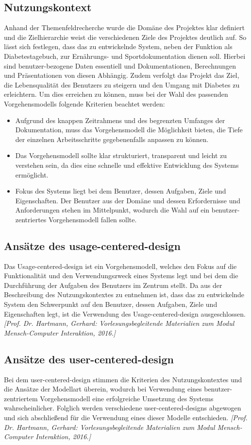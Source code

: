 \documentclass[a4paper,11pt]{article}%
\renewcommand{\\}{\vspace*{0.5\baselineskip} \newline}
\begin{document}
	\subsection{Nutzungskontext}
		Anhand der Themenfeldrecherche wurde die Domäne des Projektes klar definiert und die Zielhierarchie weist die verschiedenen Ziele des Projektes deutlich auf. So lässt sich festlegen, dass das zu entwickelnde System, neben der Funktion als Diabetestagebuch, zur Ernährungs- und Sportdokumentation dienen soll. Hierbei sind benutzer-bezogene Daten essentiell und Dokumentationen, Berechnungen und Präsentationen von diesen Abhängig. Zudem verfolgt das Projekt das Ziel, die Lebensqualität des Benutzers zu steigern und den Umgang mit Diabetes zu erleichtern. \newline
		Um dies erreichen zu können, muss bei der Wahl des passenden Vorgehensmodells folgende Kriterien beachtet werden:
		\begin{itemize}
			\item Aufgrund des knappen Zeitrahmens und des begrenzten Umfanges der Dokumentation, muss das Vorgehensmodell die Möglichkeit bieten, die Tiefe der einzelnen Arbeitsschritte gegebenenfalls anpassen zu können.
			\item Das Vorgehensmodell sollte klar strukturiert, transparent und leicht zu verstehen sein, da dies eine schnelle und effektive Entwicklung des Systems ermöglicht.
			\item Fokus des Systems liegt bei dem Benutzer, dessen Aufgaben, Ziele und Eigenschaften. Der Benutzer aus der Domäne und dessen Erfordernisse und Anforderungen stehen im Mittelpunkt, wodurch die Wahl auf ein benutzer-zentriertes Vorgehensmodell fallen sollte.
		\end{itemize}
	\subsection{Ansätze des usage-centered-design}
		Das Usage-centered-design ist ein Vorgehensmodell, welches den Fokus auf die Funktionalität und den Verwendungszweck eines Systems legt und bei dem die Durchführung der Aufgaben des Benutzers im Zentrum stellt. Da aus der Beschreibung des Nutzungskontextes zu entnehmen ist, dass das zu entwickelnde System den Schwerpunkt auf den Benutzer, dessen Aufgaben, Ziele und Eigenschaften legt, ist die Verwendung des Usage-centered-design ausgeschlossen. \emph{[Prof. Dr. Hartmann, Gerhard: Vorlesungsbegleitende Materialien zum Modul Mensch-Computer Interaktion, 2016.]}
	\subsection{Ansätze des user-centered-design}
		Bei dem user-centered-design stimmen die Kriterien des Nutzungskontextes und die Ansätze der Modellart überein, wodurch bei Verwendung eines benutzer-zentriertem Vorgehensmodell eine erfolgreiche Umsetzung des Systems wahrscheinlicher. Folglich werden verschiedene user-centered-designs abgewogen und sich abschließend für die Verwendung eines dieser Modelle entschieden. \emph{[Prof. Dr. Hartmann, Gerhard: Vorlesungsbegleitende Materialien zum Modul Mensch-Computer Interaktion, 2016.]}
\end{document}
